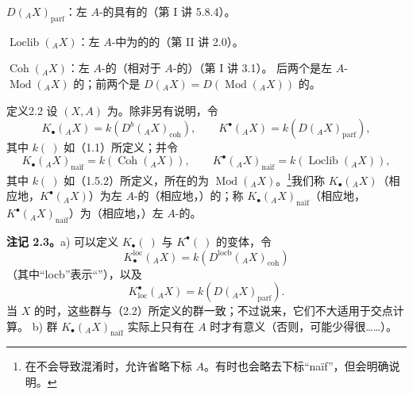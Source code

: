 $D({}_AX)_{\mathrm{parf}}$：左 $A$-的具有的（第 I 讲 5.8.4）。

$\operatorname{Loclib}({}_AX)$：左 $A$-中为的的（第 II 讲 2.0）。

$\operatorname{Coh}({}_AX)$：左 $A$-的（相对于 $A$-的）（第 I 讲 3.1）。
后两个是左 $A$- $\operatorname{Mod}({}_AX)$ 的；前两个是 $D({}_AX)=D(\operatorname{Mod}({}_AX))$ 的。

\begin{SGAresult}{定义}{2.2}
设 $(X,A)$ 为。除非另有说明，令
\[K_\bullet({}_AX)=k(D^b({}_AX)_{\mathrm{coh}}),\qquad K^\bullet({}_AX)=k(D({}_AX)_{\mathrm{parf}}),\]
其中 $k(\ )$ 如（1.1）所定义；并令
\[K_\bullet({}_AX)_{\text{naïf}}=k(\operatorname{Coh}({}_AX)),\qquad K^\bullet({}_AX)_{\text{naïf}}=k(\operatorname{Loclib}({}_AX)),\]
其中 $k(\ )$ 如（1.5.2）所定义，所在的为 $\operatorname{Mod}({}_AX)$。\footnote{在不会导致混淆时，允许省略下标 $A$。有时也会略去下标“naïf”，但会明确说明。}我们称 $K_\bullet({}_AX)$（相应地，$K^\bullet({}_AX)$）为左 $A$-的（相应地，）的；称 $K_\bullet({}_AX)_{\text{naïf}}$（相应地，$K^\bullet({}_AX)_{\text{naïf}}$）为（相应地，）左 $A$-的。
\end{SGAresult}

\textbf{注记 2.3。}a) 可以定义 $K_\bullet(\ )$ 与 $K^\bullet(\ )$ 的变体，令
\[K_\bullet^{\mathrm{loc}}({}_AX)=k(D^{\mathrm{locb}}({}_AX)_{\mathrm{coh}})\]
（其中“locb”表示“”），以及
\[K^\bullet_{\mathrm{loc}}({}_AX)=k(D({}_AX)_{\mathrm{parf}}).\]
当 $X$ 的时，这些群与（2.2）所定义的群一致；不过说来，它们不大适用于交点计算。
b) 群 $K_\bullet({}_AX)_{\text{naïf}}$ 实际上只有在 $A$ 时才有意义（否则，可能少得很……）。

